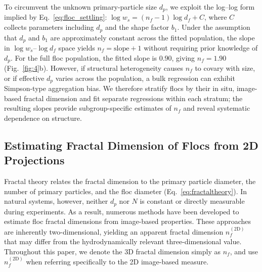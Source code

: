 \documentclass{agujournal2019}
\begin{document}
To circumvent the unknown primary-particle size \(d_p\), we exploit the log--log form implied by Eq.~\eqref{eq:floc_settling}: \(\log w_s = (n_f - 1)\log d_f + C\), where \(C\) collects parameters including \(d_p\) and the shape factor \(b_1\). Under the assumption that \(d_p\) and \(b_1\) are approximately constant across the fitted population, the slope in \(\log w_s\)--\(\log d_f\) space yields \(n_f = \text{slope} + 1\) without requiring prior knowledge of \(d_p\). For the full floc population, the fitted slope is \(0.90\), giving \(n_f = 1.90\) (Fig.~\ref{fig:4}b). However, if structural heterogeneity causes \(n_f\) to covary with size, or if effective \(d_p\) varies across the population, a bulk regression can exhibit Simpson-type aggregation bias. We therefore stratify flocs by their in situ, image-based fractal dimension and fit separate regressions within each stratum; the resulting slopes provide subgroup-specific estimates of \(n_f\) and reveal systematic dependence on structure.

\subsection{Estimating Fractal Dimension of Flocs from 2D Projections}

Fractal theory relates the fractal dimension to the primary particle diameter, the number of primary particles, and the floc diameter (Eq.~\eqref{eq:fractaltheory}). In natural systems, however, neither $d_p$ nor $N$ is constant or directly measurable during experiments. As a result, numerous methods have been developed to estimate floc fractal dimensions from image-based properties. These approaches are inherently two-dimensional, yielding an apparent fractal dimension $n_f^{(2\mathrm{D})}$ that may differ from the hydrodynamically relevant three-dimensional value. Throughout this paper, we denote the 3D fractal dimension simply as $n_f$, and use $n_f^{(2\mathrm{D})}$ when referring specifically to the 2D image-based measure.
\end{document}
